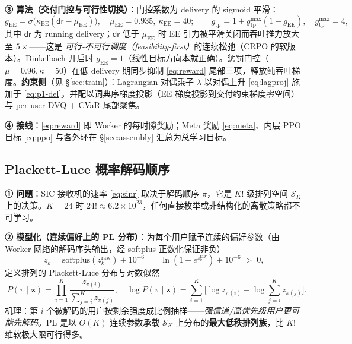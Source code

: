\documentclass[UTF8,11pt,a4paper]{ctexart}
\theoremstyle{plain}
\theoremstyle{definition}
\theoremstyle{remark}
\newcommand{\vect}[1]{\mathbf{#1}}
\begin{document}
\textbf{③ 算法（交付门控与可行性切换）}：门控系数为 delivery 的 sigmoid 平滑：
\begin{equation}
  g_{\mathrm{EE}} = \sigma\!\big(\kappa_{\mathrm{EE}}(\mathsf{dr}-\mu_{\mathrm{EE}})\big),\quad
  \mu_{\mathrm{EE}}=0.935,\ \kappa_{\mathrm{EE}}=40;\qquad
  g_{\mathrm{tp}} = 1 + g_{\mathrm{tp}}^{\max}(1-g_{\mathrm{EE}}),\quad g_{\mathrm{tp}}^{\max}=4,
  \label{eq:gates-sig}
\end{equation}
其中 $\mathsf{dr}$ 为 running delivery；$\mathsf{dr}$ 低于 $\mu_{\mathrm{EE}}$ 时 EE 引力被平滑关闭而吞吐推力放大至 $5\times$——这是 \emph{可行-不可行调度（feasibility-first）}的连续松弛（CRPO\cite{xu2021crpo} 的软版本）。Dinkelbach 开启时 $g_{\mathrm{EE}}=1$（线性目标方向本就正确）。惩罚门控（$\mu=0.96,\kappa=50$）在低 delivery 期同步抑制 \eqref{eq:reward} 尾部三项，释放纯吞吐梯度。\textbf{约束侧}（见 \S\ref{sec:train}）：Lagrangian 对偶乘子 $\lambda$ 以对偶上升 \eqref{eq:lagproj} 施加于 \eqref{eq:p1-del}，并配以词典序梯度投影（EE 梯度投影到交付约束梯度零空间）与 per-user DVQ + CVaR 尾部聚焦。

\textbf{④ 接线}：\eqref{eq:reward} 即 Worker 的每时隙奖励；Meta 奖励 \eqref{eq:meta}、内层 PPO 目标 \eqref{eq:ppo} 与各外环在 \S\ref{sec:assembly} 汇总为总学习目标。

\subsection{Plackett-Luce 概率解码顺序} \label{sec:pl}

\textbf{① 问题}：SIC 接收机的速率 \eqref{eq:sinr} 取决于解码顺序 $\pi$，它是 $K!$ 级排列空间 $\mathcal S_K$ 上的决策。$K=24$ 时 $24!\approx6.2\times10^{23}$，任何直接枚举或非结构化的离散策略都不可学习。

\textbf{② 模型化（连续偏好上的 PL 分布）}：为每个用户赋予连续的偏好参数（由 Worker 网络的解码序头输出，经 softplus 正数化保证非负）
\begin{equation}
  z_k = \mathrm{softplus}(z_k^{\mathrm{raw}}) + 10^{-6} \;=\; \ln(1+e^{z_k^{\mathrm{raw}}}) + 10^{-6}\;>\;0,
\end{equation}
定义排列的 Plackett-Luce 分布与对数似然 \cite{plackett1975analysis, luce1959}
\begin{equation}
  \boxed{\;
  P(\pi\mid\vect z) = \prod_{i=1}^{K}\frac{z_{\pi(i)}}{\sum_{j=i}^{K}z_{\pi(j)}},
  \quad
  \log P(\pi\mid\vect z) = \sum_{i=1}^{K}\Big[\log z_{\pi(i)} - \log\!\sum_{j=i}^{K} z_{\pi(j)}\Big].
  }
  \label{eq:pl}
\end{equation}
机理：第 $i$ 个被解码的用户按剩余强度成比例抽样——\emph{强信道/高优先级用户更可能先解码}。PL 是以 $O(K)$ 连续参数承载 $\mathcal S_K$ 上分布的\textbf{最大低秩排列族}，比 $K!$ 维软极大限可行得多。
\end{document}
